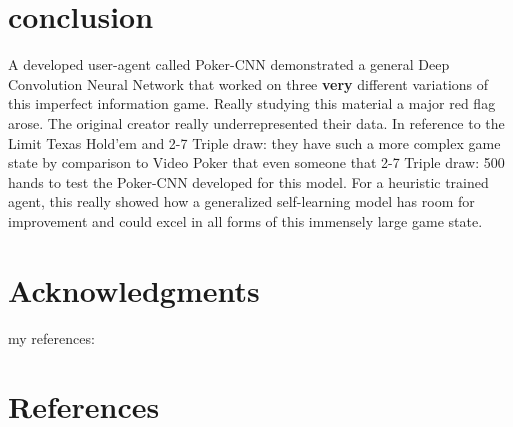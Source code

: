 \documentclass[review]{elsarticle}
\begin{document}
\section{conclusion}
A developed user-agent called Poker-CNN demonstrated a general Deep Convolution Neural Network that worked on three \textbf{very} different variations of this 
imperfect information game. Really studying this material a major red flag arose. The original creator really underrepresented their data. 
In reference to the Limit Texas Hold'em and 2-7 Triple draw: they have such a more complex 
game state by comparison to Video Poker that even someone that  
2-7 Triple draw: 500 hands to test the Poker-CNN developed for this model.
For a heuristic trained  agent, this really showed how a generalized self-learning model has room for improvement
and could excel in all forms of this immensely large game state.


\section{Acknowledgments}

my references: \cite{Moravcik2017,Garrett2010,CnnSimard2003,Stanescu2016,YakovenkoCRF15,MJohanson2013,JHeinrich2017,Dfredrik2001,GTesauro1994,ISutskeve2008,ConvecFCN,moscow25,ConvecFCN}

\normalem
\section*{References}



% 
% 
\end{document}
